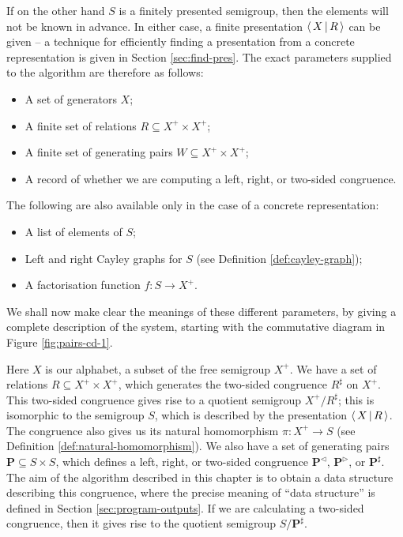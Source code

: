 If on the
other hand $S$ is a finitely presented semigroup, then the elements will not be
known in advance.  In either case, a finite presentation $\left\langle \, X \, \middle| \, R \, \right\rangle$ can be
given -- a technique for efficiently finding a presentation from a concrete
representation is given in Section \ref{sec:find-pres}.
The exact parameters supplied to the algorithm are therefore as follows:
\begin{itemize}
\item A set of generators $X$;
\item A finite set of relations $R \subseteq X^+ \times X^+$;
\item A finite set of generating pairs $W \subseteq X^+ \times X^+$;
\item A record of whether we are computing a left, right, or two-sided
  congruence.
\end{itemize}
The following are also available only in the case of a concrete representation:
\begin{itemize}
\item A list of elements of $S$;
\item Left and right Cayley graphs for $S$ (see Definition
  \ref{def:cayley-graph});
\item A factorisation function $f : S \to X^+$.
\end{itemize}

We shall now make clear the meanings of these different parameters, by giving a
complete description of the system, starting with the commutative diagram in
Figure \ref{fig:pairs-cd-1}.

Here $X$ is our alphabet, a subset of the free semigroup $X^+$.  We have a set
of relations $R \subseteq X^+ \times X^+$, which generates the two-sided
congruence $R^\sharp$ on $X^+$.  This two-sided congruence gives rise to a
quotient semigroup $X^+ / R^\sharp$; this is isomorphic to the semigroup $S$,
which is described by the presentation $\left\langle \, X \, \middle| \, R \, \right\rangle$.  The congruence also gives
us its natural homomorphism $\pi: X^+ \to S$ (see Definition
\ref{def:natural-homomorphism}).  We also have a set of generating pairs
$\mathbf{P} \subseteq S \times S$, which defines a left, right, or two-sided
congruence $\mathbf{P}^\triangleleft$, $\mathbf{P}^\triangleright$, or
$\mathbf{P}^\sharp$.  The aim of the algorithm described in this chapter is to
obtain a data structure describing this congruence, where the precise meaning of
``data structure'' is defined in Section \ref{sec:program-outputs}.  If we are
calculating a two-sided congruence, then it gives rise to the quotient semigroup
$S / \mathbf{P}^\sharp$.

